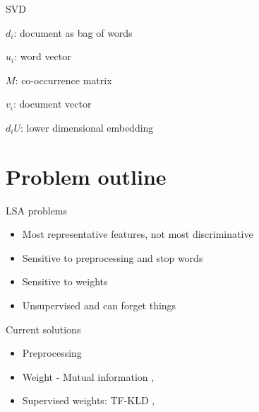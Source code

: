 \documentclass[xcolor={table}]{beamer}
\begin{document}
\begin{frame}{SVD}
~
    {\tiny }
    \begin{block}
        
        $d_i$: document as bag of words
        
        $u_i$: word vector
        
        $M$: co-occurrence matrix
        
        $v_i$: document vector
        
        $d_i U$: lower dimensional embedding
    \end{block}
\end{frame}


\section{Problem outline}
\begin{frame}{LSA problems}
    \begin{block}{}
        \begin{itemize}
            \item Most representative features, not most discriminative
            \item Sensitive to preprocessing and stop words
            \item Sensitive to weights
            \item Unsupervised and can forget things
        \end{itemize}
    \end{block}
\end{frame} 

\begin{frame}{Current solutions}
    \begin{block}{}
        \begin{itemize}
            \item Preprocessing
            \item Weight - Mutual information \cite{wu2017balancing}, \cite{deng2014study}
            \item Supervised weights: TF-KLD \cite{ji2013discriminative}, \cite{lan2009supervised}
        \end{itemize}
    \end{block}
\end{frame} 
\end{document}
